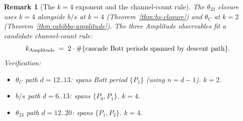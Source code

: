 \documentclass[12pt,a4paper]{article}
\newtheorem*{remark}{Remark}
\begin{document}
\begin{remark}[The $k=4$ exponent and the channel-count rule]\label{rem:theta23-channel-count}
The $\theta_{23}$ closure uses $k=4$ alongside $b/s$ at $k=4$ (Theorem~\ref{thm:bs-closure}) and $\theta_C$ at $k=2$ (Theorem~\ref{thm:cabibbo-amplitude}). The three Amplitude observables fit a candidate channel-count rule:
\[
k_{\rm Amplitude} \;=\; 2\cdot\#\{\text{cascade Bott periods spanned by descent path}\}.
\]
Verification:
\begin{itemize}[nosep]
\item $\theta_C$ path $d=12..13$: spans Bott period $\{P_1\}$ (using $n=d-1$). $k=2$. \checkmark
\item $b/s$ path $d=6..13$: spans $\{P_0, P_1\}$. $k=4$. \checkmark
\item $\theta_{23}$ path $d=12..20$: spans $\{P_1, P_2\}$. $k=4$. \checkmark
\end{itemize}

\end{remark}
\end{document}

